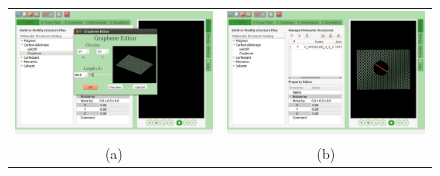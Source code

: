 \documentclass{article}
\begin{document}
\begin{figure}
\begin{center}
  \begin{tabular}{cc}
     \includegraphics[scale=0.20]{01-Graphene.png} &\includegraphics[scale=0.20]{02-Hole.png} \\
     (a) & (b)\\

\end{tabular}
\end{center}
\end{figure}
\end{document}
